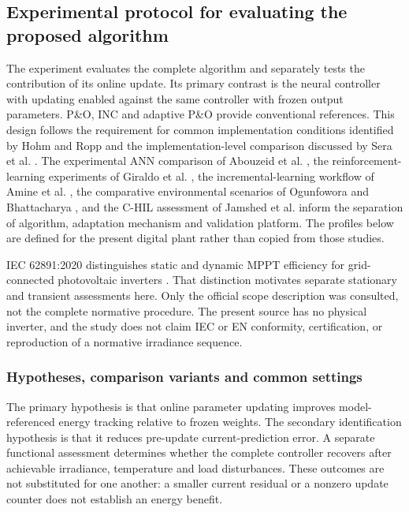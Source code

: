 \documentclass[Acad.Energy.,researcharticle,9pt,twoside,oneauthor]{Definitions/jams_academia}
\begin{document}


\clearpage

\subsection{Experimental protocol for evaluating the proposed algorithm}
\label{sec:protocol}
The experiment evaluates the complete algorithm and separately tests the contribution of its online update. Its primary contrast is the neural controller with updating enabled against the same controller with frozen output parameters. P\&O, INC and adaptive P\&O provide conventional references. This design follows the requirement for common implementation conditions identified by Hohm and Ropp \cite{hohm} and the implementation-level comparison discussed by Sera et al. \cite{sera}. The experimental ANN comparison of Abouzeid et al. \cite{abouzeid}, the reinforcement-learning experiments of Giraldo et al. \cite{giraldo}, the incremental-learning workflow of Amine et al. \cite{amine}, the comparative environmental scenarios of Ogunfowora and Bhattacharya \cite{ogunfowora}, and the C-HIL assessment of Jamshed et al. \cite{jamshed} inform the separation of algorithm, adaptation mechanism and validation platform. The profiles below are defined for the present digital plant rather than copied from those studies.

IEC 62891:2020 distinguishes static and dynamic MPPT efficiency for grid-connected photovoltaic inverters \cite{iec62891}. That distinction motivates separate stationary and transient assessments here. Only the official scope description was consulted, not the complete normative procedure. The present source has no physical inverter, and the study does not claim IEC or EN conformity, certification, or reproduction of a normative irradiance sequence.

\subsubsection{Hypotheses, comparison variants and common settings}
The primary hypothesis is that online parameter updating improves model-referenced energy tracking relative to frozen weights. The secondary identification hypothesis is that it reduces pre-update current-prediction error. A separate functional assessment determines whether the complete controller recovers after achievable irradiance, temperature and load disturbances. These outcomes are not substituted for one another: a smaller current residual or a nonzero update counter does not establish an energy benefit.
\end{document}
